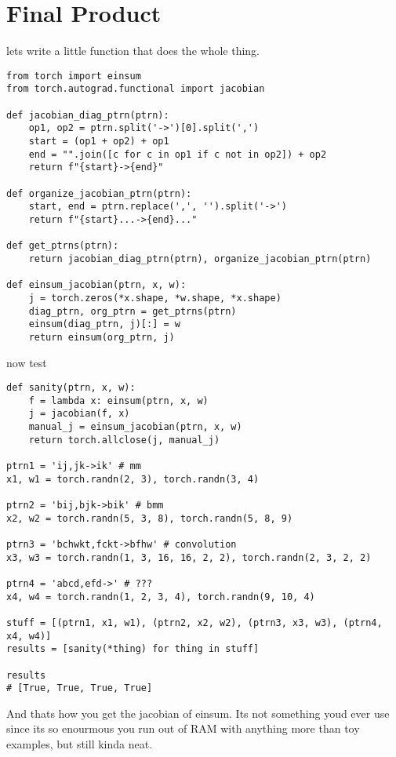 \documentclass[11pt]{article}
\begin{document}
\section*{Final Product}

lets write a little function that does the whole thing. 
\begin{verbatim}
from torch import einsum
from torch.autograd.functional import jacobian

def jacobian_diag_ptrn(ptrn):
    op1, op2 = ptrn.split('->')[0].split(',')
    start = (op1 + op2) + op1
    end = "".join([c for c in op1 if c not in op2]) + op2
    return f"{start}->{end}"

def organize_jacobian_ptrn(ptrn):
    start, end = ptrn.replace(',', '').split('->')
    return f"{start}...->{end}..."

def get_ptrns(ptrn):
    return jacobian_diag_ptrn(ptrn), organize_jacobian_ptrn(ptrn)

def einsum_jacobian(ptrn, x, w):
    j = torch.zeros(*x.shape, *w.shape, *x.shape)
    diag_ptrn, org_ptrn = get_ptrns(ptrn)
    einsum(diag_ptrn, j)[:] = w
    return einsum(org_ptrn, j)
\end{verbatim}
now test
\begin{verbatim}
def sanity(ptrn, x, w):
    f = lambda x: einsum(ptrn, x, w)
    j = jacobian(f, x)
    manual_j = einsum_jacobian(ptrn, x, w)
    return torch.allclose(j, manual_j)

ptrn1 = 'ij,jk->ik' # mm
x1, w1 = torch.randn(2, 3), torch.randn(3, 4)

ptrn2 = 'bij,bjk->bik' # bmm
x2, w2 = torch.randn(5, 3, 8), torch.randn(5, 8, 9)

ptrn3 = 'bchwkt,fckt->bfhw' # convolution
x3, w3 = torch.randn(1, 3, 16, 16, 2, 2), torch.randn(2, 3, 2, 2)

ptrn4 = 'abcd,efd->' # ???
x4, w4 = torch.randn(1, 2, 3, 4), torch.randn(9, 10, 4)

stuff = [(ptrn1, x1, w1), (ptrn2, x2, w2), (ptrn3, x3, w3), (ptrn4, x4, w4)]
results = [sanity(*thing) for thing in stuff] 

results
# [True, True, True, True]
\end{verbatim}

And thats how you get the jacobian of einsum.
Its not something youd ever use since its so enourmous 
you run out of RAM with anything more than toy examples, but still kinda neat. 
\end{document}
